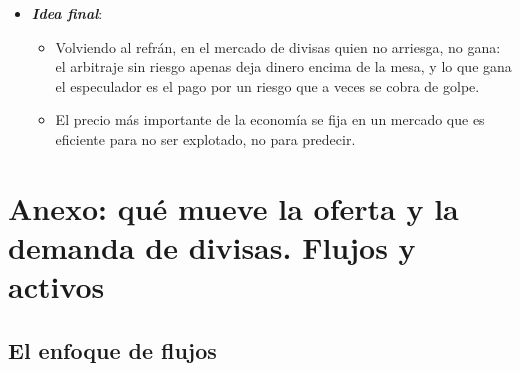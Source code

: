 \documentclass[11pt]{article}
\begin{document}
\begin{itemize}
\begin{itemize}
  \item Por eso los bancos centrales acumulan reservas y se ofrecen líneas \emph{swap} en las crisis, y por eso el \emph{carry trade} sube por la escalera y baja en ascensor.
  \end{itemize}
\item \textbf{\emph{Idea final}}:
  \begin{itemize}
  \item Volviendo al refrán, en el mercado de divisas quien no arriesga, no gana: el arbitraje sin riesgo apenas deja dinero encima de la mesa, y lo que gana el especulador es el pago por un riesgo que a veces se cobra de golpe.

  \item El precio más importante de la economía se fija en un mercado que es eficiente para no ser explotado, no para predecir.
  \end{itemize}
\end{itemize}

\clearpage
\appendix

\section{Anexo: qué mueve la oferta y la demanda de divisas.\cortetitulo{} Flujos y activos}\label{anexo:flujos-activos}

\subsection{El enfoque de flujos}
\end{document}
